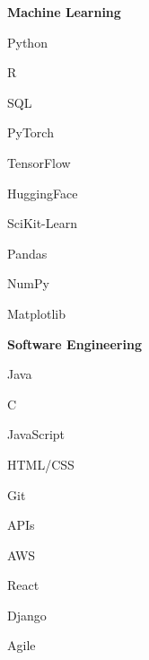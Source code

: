 \documentclass{article}
\newcommand{\headingList}[1]{\vspace*{5pt}\textbf{#1}}
\begin{document}
\headingList{Machine Learning}
\begin{itemize*}[label=$|$]
    \item Python
    \item R
    \item SQL
    \item PyTorch
    \item TensorFlow
    \item HuggingFace
    \item SciKit-Learn
    \item Pandas
    \item NumPy
    \item Matplotlib
\end{itemize*}

\headingList{Software Engineering}
\begin{itemize*}[label=$|$]
    \item Java
    \item C
    \item JavaScript 
    \item HTML/CSS 
    \item Git
    \item APIs
    \item AWS
    \item React
    \item Django
    \item Agile
\end{itemize*}
\end{document}
